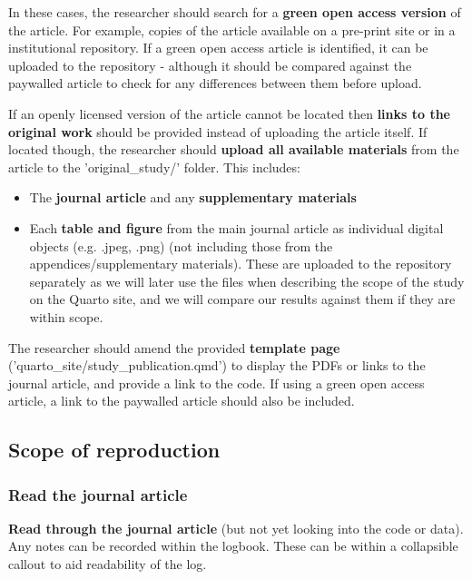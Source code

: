 In these cases, the researcher should search for a \textbf{green open access version} of the article. For example, copies of the article available on a pre-print site or in a institutional repository. If a green open access article is identified, it can be uploaded to the repository - although it should be compared against the paywalled article to check for any differences between them before upload.

If an openly licensed version of the article cannot be located then \textbf{links to the original work} should be provided instead of uploading the article itself. If located though, the researcher should \textbf{upload all available materials} from the article to the 'original\_study/' folder. This includes:
\begin{itemize}
    \item The \textbf{journal article} and any \textbf{supplementary materials}
    \item Each \textbf{table and figure} from the main journal article as individual digital objects (e.g. .jpeg, .png) (not including those from the appendices/supplementary materials). These are uploaded to the repository separately as we will later use the files when describing the scope of the study on the Quarto site, and we will compare our results against them if they are within scope.
\end{itemize}

The researcher should amend the provided \textbf{template page} ('quarto\_site/study\_publication.qmd') to display the PDFs or links to the journal article, and provide a link to the code. If using a green open access article, a link to the paywalled article should also be included.

\vspace{0.5cm}
\subsection{Scope of reproduction}

\subsubsection{Read the journal article}

\textbf{Read through the journal article} (but not yet looking into the code or data). Any notes can be recorded within the logbook. These can be within a collapsible callout to aid readability of the log.

\vspace{0.5cm}
